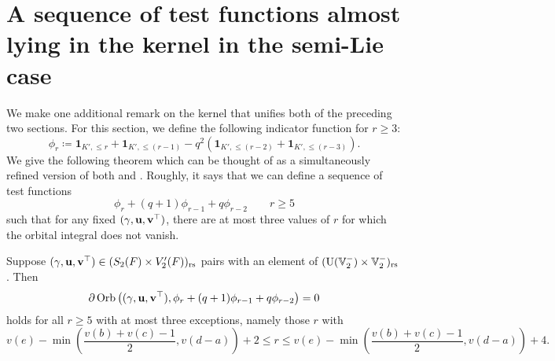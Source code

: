 \section{A sequence of test functions almost lying in the kernel in the semi-Lie case}
We make one additional remark on the kernel that unifies both of the preceding two sections.
For this section, we define the following indicator function for $r \ge 3$:
\[ \phi_r \coloneqq \mathbf{1}_{K', \le r} + \mathbf{1}_{K', \le (r-1)}
   - q^2 (\mathbf{1}_{K', \le (r-2)} + \mathbf{1}_{K', \le (r-3)}). \]
We give the following theorem which can be thought of as a simultaneously
refined version of both  and
.
Roughly, it says that we can define a sequence of test functions
\[ \phi_r + (q+1)\phi_{r-1} + q\phi_{r-2} \qquad r \ge 5 \]
such that for any fixed ${(\gamma, \mathbf u, \mathbf v^\top)}$, there are at most three values of $r$
for which the orbital integral does not vanish.
\begin{theorem}
  \label{thm:semi_lie_finite_codim_full}
  Suppose ${(\gamma, \mathbf u, \mathbf v^\top)} \in (S_2(F) \times V_2'(F))_{\mathrm{rs}}$
  pairs with an element of $(\operatorname{U}(\mathbb V_2^-) \times \mathbb V_2^-)_{\mathrm{rs}}$.
  Then
  \[ \partial \operatorname{Orb} \left( {(\gamma, \mathbf u, \mathbf v^\top)}, \phi_r + (q+1)\phi_{r-1} + q\phi_{r-2} \right) = 0 \]
  holds for all $r \ge 5$ with at most three exceptions,
  namely those $r$ with
  \[ v(e) - \min\left(\frac{v(b)+v(c)-1}{2}, v(d-a)\right) + 2
    \le r \le v(e) - \min\left(\frac{v(b)+v(c)-1}{2}, v(d-a)\right) + 4. \]
\end{theorem}
